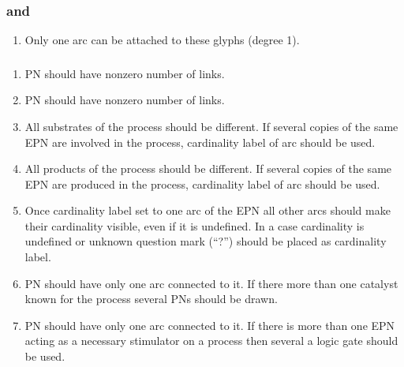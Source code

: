 \subsubsection{ and }

 \begin{enumerate}
    \item Only one arc can be attached to these glyphs (degree 1).
  \end{enumerate}

\subsubsection{}
 \begin{enumerate}
    \item PN should have nonzero number of  links.
    \item PN should have nonzero number of  links.
    \item All substrates of the process should be different. If several 
    copies of the same EPN are involved in the process, cardinality label of 
     arc should be used.
    \item All products of the process should be different. If several copies 
    of the same EPN are produced in the process, cardinality label of 
     arc should be used.
    \item Once cardinality label set to one arc of the EPN all other arcs should
    make their cardinality visible, even if it is undefined. In a case
    cardinality is undefined or unknown question mark (``?'') should be placed as cardinality label. 
    \item PN should have only one  arc connected to it. If
    there more than one catalyst known for the process several PNs should be
    drawn. 
    \item PN should have only one  arc connected to it. If
    there is more than one EPN acting as a necessary stimulator on a process then several a logic gate should be used.    \end{enumerate}  

\subsubsection{}

